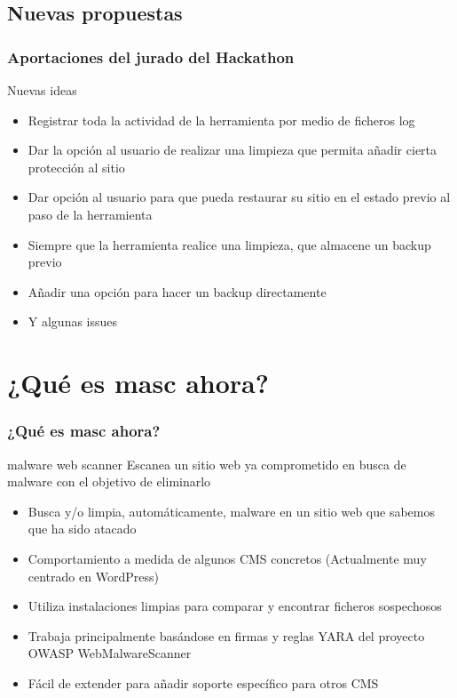 \documentclass[xcolor={dvipsnames}]{beamer}
\begin{document}
\subsection{Nuevas propuestas}
\begin{frame}\frametitle{Aportaciones del jurado del Hackathon}
    \begin{block}{Nuevas ideas}
    \begin{itemize}
        \item Registrar toda la actividad de la herramienta por medio de ficheros log
        \item Dar la opción al usuario de realizar una limpieza que permita añadir cierta protección al sitio
        \item Dar opción al usuario para que pueda restaurar su sitio en el estado previo al paso de la herramienta
        \item Siempre que la herramienta realice una limpieza, que almacene un backup previo
        \item Añadir una opción para hacer un backup directamente
        \item Y algunas issues
    \end{itemize}
    \end{block}
\end{frame}

\section{¿Qué es masc ahora?} 
\begin{frame}\frametitle{¿Qué es masc ahora?} 

    \begin{block}{malware web scanner}
    Escanea un sitio web ya comprometido en busca de malware con el objetivo de eliminarlo
    \end{block}

    \begin{itemize}
        \item Busca y/o limpia, automáticamente, malware en un sitio web que sabemos que ha sido atacado
        \item Comportamiento a medida de algunos CMS concretos (Actualmente muy centrado en WordPress)
        \item Utiliza instalaciones limpias para comparar y encontrar ficheros sospechosos
        \item Trabaja principalmente basándose en firmas y reglas YARA del proyecto OWASP WebMalwareScanner
        \item Fácil de extender para añadir soporte específico para otros CMS
    \end{itemize}
\end{frame}
\end{document}
